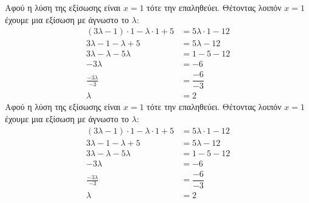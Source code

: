 Αφού η λύση της εξίσωσης είναι $ x=1 $ τότε την επαληθεύει. Θέτοντας λοιπόν $ x=1 $ έχουμε μια εξίσωση με άγνωστο το $ \lambda $:
\begin{align*}
(3\lambda-1)\cdot 1-\lambda\cdot 1+5&=5\lambda\cdot 1-12\\
3\lambda-1-\lambda+5&=5\lambda-12\\
3\lambda-\lambda-5\lambda &=1-5-12\\
-3\lambda &=-6\\
\frac{-3\lambda}{-3}&=\dfrac{-6}{-3}\\
\lambda &=2
\end{align*}
Αφού η λύση της εξίσωσης είναι $ x=1 $ τότε την επαληθεύει. Θέτοντας λοιπόν $ x=1 $ έχουμε μια εξίσωση με άγνωστο το $ \lambda $:
\begin{align*}
(3\lambda-1)\cdot 1-\lambda\cdot 1+5&=5\lambda\cdot 1-12\\
3\lambda-1-\lambda+5&=5\lambda-12\\
3\lambda-\lambda-5\lambda &=1-5-12\\
-3\lambda &=-6\\
\frac{-3\lambda}{-3}&=\dfrac{-6}{-3}\\
\lambda &=2
\end{align*}
